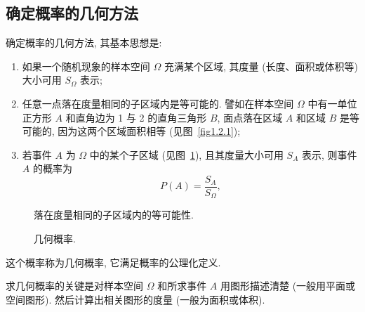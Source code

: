 \subsection{确定概率的几何方法}

确定概率的几何方法,
其基本思想是:
\begin{enumerate}
  \item 如果一个随机现象的样本空间 $\Omega$ 充满某个区域,
  其度量 (长度、面积或体积等) 大小可用 $S_\Omega$ 表示;
  \item 任意一点落在度量相同的子区域内是等可能的.
  譬如在样本空间 $\Omega$ 中有一单位正方形 $A$ 和直角边为 1 与 2 的直角三角形 $B$,
  面点落在区域 $A$ 和区域 $B$ 是等可能的,
  因为这两个区域面积相等 (见图~\ref{fig1.2.1});
  \item 若事件 $A$ 为 $\Omega$ 中的某个子区域 (见图~\ref{fig1.2.2}),
  且其度量大小可用 $S_A$ 表示,
  则事件 $A$ 的概率为
  \begin{equation}
    P (A) = \frac{S_A}{S_\Omega},
    \label{eq1.2.13}
  \end{equation}
\end{enumerate}

\begin{figure}[!ht]
  \centering
  \begin{minipage}[b]{0.5\linewidth}
  \centering
  \caption{落在度量相同的子区域内的等可能性.}
  \label{fig1.2.1}
  \end{minipage}%
  \begin{minipage}[b]{0.5\linewidth}
  \centering
  \caption{几何概率.}
  \label{fig1.2.2}
  \end{minipage}
\end{figure}

这个概率称为几何概率,
它满足概率的公理化定义.

求几何概率的关键是对样本空间 $\Omega$ 和所求事件 $A$ 用图形描述清楚 (一般用平面或空间图形).
然后计算出相关图形的度量 (一般为面积或体积).

